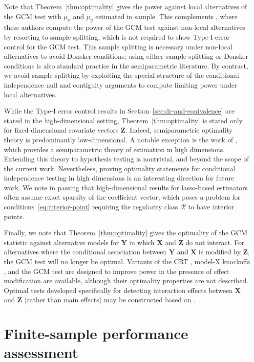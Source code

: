 \documentclass[12pt]{article}
\theoremstyle{definition}
\theoremstyle{remark}
\newcommand{\prx}{\bm X}								%
\newcommand{\prz}{\bm Z}								%
\newcommand{\pry}{{\bm Y}}								%
\newcommand{\regclass}{\mathscr R}					    %
\begin{document}
	Note that Theorem~\ref{thm:optimality} gives the power against local alternatives of the GCM test with $\mu_x$ and $\mu_y$ estimated in sample. This complements \citet[Theorem 8]{Shah2018}, where these authors compute the power of the GCM test against non-local alternatives by resorting to sample splitting, which is not required to show Type-I error control for the GCM test. This sample splitting is necessary under non-local alternatives to avoid Donsker conditions; using either sample splitting or Donsker conditions is also standard practice in the semiparametric literature. By contrast, we avoid sample splitting by exploiting the special structure of the conditional independence null and contiguity arguments to compute limiting power under local alternatives.
	
	While the Type-I error control results in Section~\ref{sec:dr-and-equivalence} are stated in the high-dimensional setting, Theorem~\ref{thm:optimality} is stated only for fixed-dimensional covariate vectors $\prz$. Indeed, semiparametric optimality theory is predominantly low-dimensional. A notable exception is the work of \citet{Jankova2018a}, which provides a semiparametric theory of estimation in high dimensions. Extending this theory to hypothesis testing is nontrivial, and beyond the scope of the current work. Nevertheless, proving optimality statements for conditional independence testing in high dimensions is an interesting direction for future work. We note in passing that high-dimensional results for lasso-based estimators often assume exact sparsity of the coefficient vector, which poses a problem for conditions~\eqref{eq:interior-point} requiring the regularity class $\regclass$ to have interior points.
	
	Finally, we note that Theorem~\ref{thm:optimality} gives the optimality of the GCM statistic against alternative models for $\pry$ in which $\prx$ and $\prz$ do not interact. For alternatives where the conditional association between $\pry$ and $\prx$ is modified by $\prz$,  the GCM test will no longer be optimal. Variants of the CRT \citep{Zhong2021, Sesia2022}, model-X knockoffs \citep{Li2021b}, and the GCM test \citep{Lundborg2022} are designed to improve power in the presence of effect modification are available, although their optimality properties are not described. Optimal tests developed specifically for detecting interaction effects between $\bm X$ and $\bm Z$ (rather than main effects) may be constructed based on \citet{Vansteelandt2008}.
	
	\section{Finite-sample performance assessment} \label{sec:simulations}
	
\end{document}
